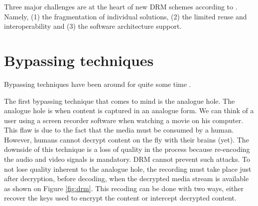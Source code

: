 \documentclass[11pt, twocolumn]{article}
\begin{document}
Three major challenges are at the heart of new DRM schemes according to \cite{Michiels:2005}. Namely, (1) the fragmentation of individual solutions, (2) the limited reuse and interoperability and (3) the software architecture support.

\section{Bypassing techniques}

Bypassing techniques have been around for quite some time \cite{Hauser:2003}.

The first bypassing technique that comes to mind is the analogue hole.
The analogue hole is when content is captured in an analogue form.
We can think of a user using a screen recorder software when watching a movie on his computer.
This flaw is due to the fact that the media must be consumed by a human.
However, humans cannot decrypt content on the fly with their brains (yet).
The downside of this technique is a loss of quality in the process because re-encoding the audio and video signals is mandatory.
DRM cannot prevent such attacks.
To not lose quality inherent to the analogue hole, the recording must take place just after decryption, before decoding, when the decrypted media stream is available as shown on Figure \ref{fig:drm}.
This recoding can be done with two ways, either recover the keys used to encrypt the content or intercept decrypted content.
\end{document}
